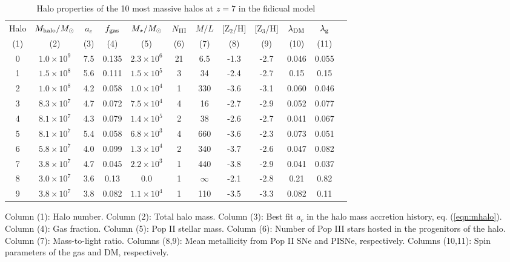 \begin{table*}
\begin{minipage}{13cm}
\caption{Halo properties of the 10 most massive halos at $z=7$ in the
  fidicual model}
\label{tab:halos}
\begin{tabular}{@{}cccccccccccc}
\hline 

Halo & $M_{\rm halo}/\Ms$ & $a_c$ & $f_{\rm gas}$ & $M_\star/\Ms$ & $N_{\rm
  III}$ & $M/L$ & [Z$_2$/H] & [Z$_3$/H] & $\lambda_{\rm DM}$ &
$\lambda_{\rm g}$ \\

(1) & (2) & (3) & (4) & (5) & (6) & (7) & (8) & (9) & (10) & (11) \\

\hline

0 & $1.0 \times 10^9$ & 7.5 & 0.135 & $2.3 \times 10^6$ & 21 & 6.5 & -1.3 &
-2.7 & 0.046 & 0.055 \\

1 & $1.5 \times 10^8$ & 5.6 & 0.111 & $1.5 \times 10^5$ & 3 & 34 & -2.4 &
-2.7 & 0.15 & 0.15 \\

2 & $1.0 \times 10^8$ & 4.2 & 0.058 & $1.0 \times 10^4$ & 1 & 330 & -3.6 &
-3.1 & 0.060 & 0.046 \\

3 & $8.3 \times 10^7$ & 4.7 & 0.072 & $7.5 \times 10^4$ & 4 & 16 & -2.7 &
-2.9 & 0.052 & 0.077 \\

4 & $8.1 \times 10^7$ & 4.3 & 0.079 & $1.4 \times 10^5$ & 2 & 38 & -2.6 &
-2.7 & 0.041 & 0.067 \\

5 & $8.1 \times 10^7$ & 5.4 & 0.058 & $6.8 \times 10^3$ & 4 & 660 & -3.6 &
-2.3 & 0.073 & 0.051 \\

6 & $5.8 \times 10^7$ & 4.0 & 0.099 & $1.3 \times 10^4$ & 2 & 340 & -3.7 &
-2.6 & 0.047 & 0.082 \\

7 & $3.8 \times 10^7$ & 4.7 & 0.045 & $2.2 \times 10^3$ & 1 & 440 & -3.8 &
-2.9 & 0.041 & 0.037 \\

8 & $3.0 \times 10^7$ & 3.6 & 0.13 & $0.0$ & 1 & $\infty$ & -2.1 & -2.8 & 0.21 &
0.82 \\

9 & $3.8 \times 10^7$ & 3.8 & 0.082 & $1.1 \times 10^4$ & 1 & 110 & -3.5 &
-3.3 & 0.082 & 0.11 \\

\hline
\end{tabular}
\medskip

Column (1): Halo number.  Column (2): Total halo mass.  Column (3):
Best fit $a_c$ in the halo mass accretion history,
eq. (\ref{eqn:mhalo}).  Column (4): Gas fraction.  Column (5): Pop II
stellar mass.  Column (6): Number of Pop III stars hosted in the
progenitors of the halo.  Column (7): Mass-to-light ratio.  Columns
(8,9): Mean metallicity from Pop II SNe and PISNe, respectively.
Columns (10,11): Spin parameters of the gas and DM, respectively.

\end{minipage}
\end{table*}
